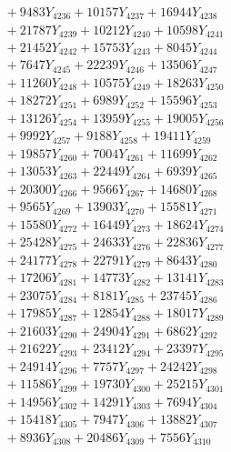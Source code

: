 \documentclass[a4paper,10pt]{article}
\begin{document}
{\begin{align}
&\;  + 9483 Y_{4236} + 10157 Y_{4237} + 16944 Y_{4238} \\[0.3ex]
&\;  + 21787 Y_{4239} + 10212 Y_{4240} + 10598 Y_{4241} \\[0.3ex]
&\;  + 21452 Y_{4242} + 15753 Y_{4243} + 8045 Y_{4244} \\[0.3ex]
&\;  + 7647 Y_{4245} + 22239 Y_{4246} + 13506 Y_{4247} \\[0.3ex]
&\;  + 11260 Y_{4248} + 10575 Y_{4249} + 18263 Y_{4250} \\[0.3ex]
&\;  + 18272 Y_{4251} + 6989 Y_{4252} + 15596 Y_{4253} \\[0.3ex]
&\;  + 13126 Y_{4254} + 13959 Y_{4255} + 19005 Y_{4256} \\[0.3ex]
&\;  + 9992 Y_{4257} + 9188 Y_{4258} + 19411 Y_{4259} \\[0.5ex]\allowbreak
&\;  + 19857 Y_{4260} + 7004 Y_{4261} + 11699 Y_{4262} \\[0.3ex]
&\;  + 13053 Y_{4263} + 22449 Y_{4264} + 6939 Y_{4265} \\[0.3ex]
&\;  + 20300 Y_{4266} + 9566 Y_{4267} + 14680 Y_{4268} \\[0.3ex]
&\;  + 9565 Y_{4269} + 13903 Y_{4270} + 15581 Y_{4271} \\[0.3ex]
&\;  + 15580 Y_{4272} + 16449 Y_{4273} + 18624 Y_{4274} \\[0.3ex]
&\;  + 25428 Y_{4275} + 24633 Y_{4276} + 22836 Y_{4277} \\[0.3ex]
&\;  + 24177 Y_{4278} + 22791 Y_{4279} + 8643 Y_{4280} \\[0.3ex]
&\;  + 17206 Y_{4281} + 14773 Y_{4282} + 13141 Y_{4283} \\[0.3ex]
&\;  + 23075 Y_{4284} + 8181 Y_{4285} + 23745 Y_{4286} \\[0.3ex]
&\;  + 17985 Y_{4287} + 12854 Y_{4288} + 18017 Y_{4289} \\[0.5ex]\allowbreak
&\;  + 21603 Y_{4290} + 24904 Y_{4291} + 6862 Y_{4292} \\[0.3ex]
&\;  + 21622 Y_{4293} + 23412 Y_{4294} + 23397 Y_{4295} \\[0.3ex]
&\;  + 24914 Y_{4296} + 7757 Y_{4297} + 24242 Y_{4298} \\[0.3ex]
&\;  + 11586 Y_{4299} + 19730 Y_{4300} + 25215 Y_{4301} \\[0.3ex]
&\;  + 14956 Y_{4302} + 14291 Y_{4303} + 7694 Y_{4304} \\[0.3ex]
&\;  + 15418 Y_{4305} + 7947 Y_{4306} + 13882 Y_{4307} \\[0.3ex]
&\;  + 8936 Y_{4308} + 20486 Y_{4309} + 7556 Y_{4310} \\[0.3ex]

\end{align}}
\end{document}
